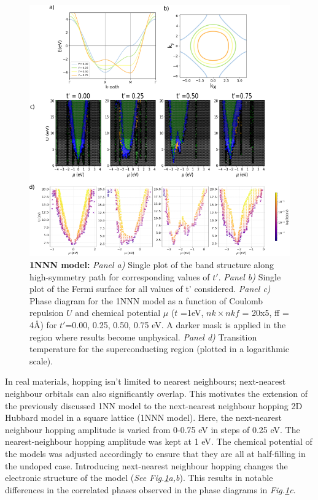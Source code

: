 \documentclass[11pt]{article}
\begin{document}
\begin{figure}[htbp]  %
    \centering
    \includegraphics[width=1.0\textwidth]{1NNN.png}  %
    \caption{\textbf{1NNN model:} \textit{Panel a)} Single plot of the band structure along high-symmetry path for corresponding values of $t'$.
    \textit{Panel b)} Single plot of the Fermi surface for all values of t' considered.
    \textit{Panel c)} Phase diagram for the 1NNN model as a function of Coulomb repulsion $U$ and chemical potential $\mu$ ($t$ =1eV, $nk \times nkf$ = 20x5, ff = 4\AA) for $t'$=0.00, 0.25, 0.50, 0.75 eV. 
    A darker mask is applied in the region where results become unphysical.
    \textit{Panel d)} Transition temperature for the superconducting region (plotted in a logarithmic scale).
   }
    
    \label{fig:1NNN}
\end{figure}

In real materials, hopping isn't limited to nearest neighbours; next-nearest neighbour orbitals can also significantly overlap. This motivates the extension of the previously
discussed 1NN model to the next-nearest neighbour hopping 2D Hubbard model in a square lattice (1NNN model). 
Here, the next-nearest neighbour hopping amplitude is varied from 0-0.75 eV in steps of 0.25 eV.
The nearest-neighbour hopping amplitude was kept at 1 eV.
The chemical potential of the models was adjusted accordingly to ensure that they are all
at half-filling in the undoped case. Introducing next-nearest neighbour hopping 
changes the electronic structure of the model (\textit{See Fig.\ref{fig:1NNN}a,b}). This results in notable
differences in the correlated phases observed in the phase diagrams in \textit{Fig.\ref{fig:1NNN}c}.\par
\medskip
\end{document}
